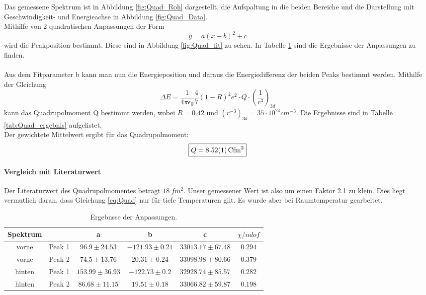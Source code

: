 \documentclass[12pt,a4paper]{article}
\begin{document}
Das gemessene Spektrum ist in Abbildung \ref{fig:Quad_Roh} dargestellt, die Aufspaltung in die beiden Bereiche und die Darstellung mit Geschwindigkeit- und Energieachse in Abbildung \ref{fig:Quad_Data}.\\
Mithilfe von 2 quadratischen Anpassungen der Form
\begin{equation}
y = a(x-b)^2+c
\end{equation}
wird die Peakposition bestimmt. Diese sind in Abbildung \ref{fig:Quad_fit} zu sehen. In Tabelle \ref{tab:Quad_vor} sind die Ergebnisse der Anpassungen zu finden.\\
\\
Aus dem Fitparameter b kann man nun die Energieposition und daraus die Energiedifferenz der beiden Peaks bestimmt werden. Mithilfe der Gleichung
\begin{equation}
\Delta E = \dfrac{1}{4 \pi \epsilon_0}\dfrac{4}{7}(1-R)^2e^2\cdot Q \cdot \left(\dfrac{1}{r^3}\right)_{3d}
\label{eq:Quad}
\end{equation}
kann das Quadrupolmoment Q bestimmt werden, wobei $R = 0.42$ und $(r^{-3})_{3d} = 35\cdot 10^{24} cm^{-3}$. Die Ergebnisse sind in Tabelle \ref{tab:Quad_ergebnis} aufgelistet.\\
Der gewichtete Mittelwert ergibt für das Quadrupolmoment:
\begin{equation*}
\boxed{Q = \SI{8.52\pm 0.01}{C fm^2}}
\end{equation*}

\paragraph{Vergleich mit Literaturwert}
Der Literaturwert des Quadrupolmomentes beträgt $\SI{18}{fm^2}$. Unser gemessener Wert ist also um einen Faktor 2.1 zu klein. Dies liegt vermutlich daran, dass Gleichung \ref{eq:Quad} nur für tiefe Temperaturen gilt. Es wurde aber bei Raumtemperatur gearbeitet.


\begin{table}
\centering
\begin{tabular}{|c|c|c|c|c|c|}
\hline
Spektrum &  & a & b & c & $\chi / ndof$\\
\hline
vorne & Peak 1 & $ 96.9 \pm 24.53 $ & $ -121.93 \pm 0.21 $ & $ 33013.17 \pm 67.48 $ & $ 0.294 $\\
\hline
vorne & Peak 2& $ 74.5 \pm 13.76 $ & $ 20.31 \pm 0.24 $ & $ 33098.98 \pm 80.66 $ & $ 0.379 $\\
\hline
\hline
hinten & Peak 1& $ 153.99 \pm 36.93 $ & $ -122.73 \pm 0.2 $ & $ 32928.74 \pm 85.57 $ & $ 0.282 $\\
\hline
hinten & Peak 2& $ 86.68 \pm 11.15 $ & $ 19.51 \pm 0.18 $ & $ 33066.82 \pm 59.87 $ & $ 0.198 $\\
\hline
\end{tabular}
\caption{Ergebnsse der Anpassungen.}
\label{tab:Quad_vor}
\end{table}
\end{document}
